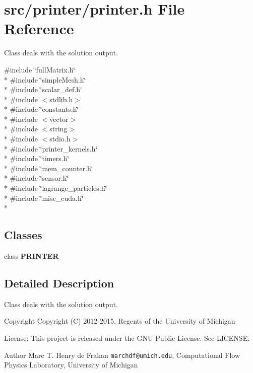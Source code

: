 \section{src/printer/printer.h File Reference}
\label{printer_8h}


Class deals with the solution output.  


{\ttfamily \#include \char`\"{}full\-Matrix.\-h\char`\"{}}\\*
{\ttfamily \#include \char`\"{}simple\-Mesh.\-h\char`\"{}}\\*
{\ttfamily \#include \char`\"{}scalar\-\_\-def.\-h\char`\"{}}\\*
{\ttfamily \#include $<$stdlib.\-h$>$}\\*
{\ttfamily \#include \char`\"{}constants.\-h\char`\"{}}\\*
{\ttfamily \#include $<$vector$>$}\\*
{\ttfamily \#include $<$string$>$}\\*
{\ttfamily \#include $<$stdio.\-h$>$}\\*
{\ttfamily \#include \char`\"{}printer\-\_\-kernels.\-h\char`\"{}}\\*
{\ttfamily \#include \char`\"{}timers.\-h\char`\"{}}\\*
{\ttfamily \#include \char`\"{}mem\-\_\-counter.\-h\char`\"{}}\\*
{\ttfamily \#include \char`\"{}sensor.\-h\char`\"{}}\\*
{\ttfamily \#include \char`\"{}lagrange\-\_\-particles.\-h\char`\"{}}\\*
{\ttfamily \#include \char`\"{}misc\-\_\-cuda.\-h\char`\"{}}\\*
\subsection*{Classes}
\begin{DoxyCompactItemize}
\item 
class {\bf P\-R\-I\-N\-T\-E\-R}
\end{DoxyCompactItemize}


\subsection{Detailed Description}
Class deals with the solution output. \begin{DoxyCopyright}{Copyright}
Copyright (C) 2012-\/2015, Regents of the University of Michigan 
\end{DoxyCopyright}
\begin{DoxyParagraph}{License\-:}
This project is released under the G\-N\-U Public License. See L\-I\-C\-E\-N\-S\-E. 
\end{DoxyParagraph}
\begin{DoxyAuthor}{Author}
Marc T. Henry de Frahan {\tt marchdf@umich.\-edu}, Computational Flow Physics Laboratory, University of Michigan 
\end{DoxyAuthor}
